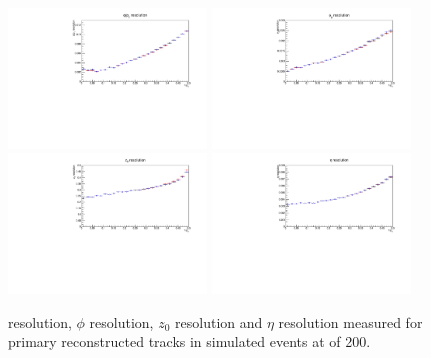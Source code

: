 \begin{figure}[htb]
\centering
\includegraphics[width=0.47\textwidth]{figs/tk-upgrade/results-lowPtTracking/qOverPtResVsInvPtFlatGeometry_5000.pdf}
\includegraphics[width=0.47\textwidth]{figs/tk-upgrade/results-lowPtTracking/phi0ResVsInvPtFlatGeometry_5000.pdf}
\\
\includegraphics[width=0.47\textwidth]{figs/tk-upgrade/results-lowPtTracking/z0ResVsInvPtFlatGeometry_5000.pdf}
\includegraphics[width=0.47\textwidth]{figs/tk-upgrade/results-lowPtTracking/etaResVsInvPtFlatGeometry_5000.pdf}
\caption{\pt resolution, $\phi$ resolution, $z_{0}$ resolution and $\eta$ resolution measured for primary reconstructed tracks in simulated \ttbar events at \PU of 200.}
\label{fig:htHelixParametersResVsInvPt}
\end{figure}

